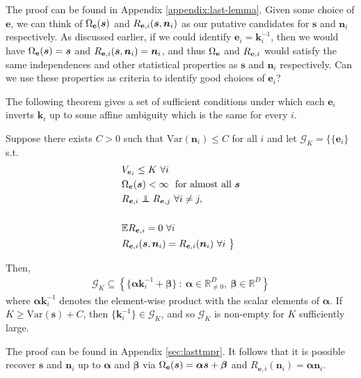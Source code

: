 The proof can be found in Appendix \ref{appendix:last-lemma}.
Given some choice of $\bm{e}$, we can think of $\Omega_{\mathbf{e}}(\bm{s})$ and $R_{\mathbf{e}, i}(\bm{s}, \bm{n}_i)$ as our putative candidates for $\bm{s}$ and $\bm{n}_i$ respectively.
As discussed earlier, if we could identify $\bm{e}_i=\bm{k}_i^{-1}$, then we would have $\Omega_{\mathbf{e}}(\bm{s}) = \bm{s}$ and $R_{\mathbf{e}, i}(\bm{s}, \bm{n}_i) = \bm{n}_i$, and thus $\Omega_{\mathbf{e}}$ and $R_{\mathbf{e}, i}$ would satisfy the same independences and other statistical properties as $\bm{s}$ and $\bm{n}_i$ respectively.
Can we use these properties as criteria to identify good choices of $\bm{e}_i$?

The following theorem gives a set of sufficient conditions under which each $\bm{e}_i$ inverts $\bm{k}_i$ up to some affine ambiguity which is the same for every $i$.

\begin{theorem}
\label{thm:lastthm}
Suppose there exists $C>0$ such that $\text{Var}(\bm{n}_i) \leq C$ for all $i$ and let $\mathcal{G}_K = \big\lbrace
\{\bm{e}_i \}$ s.t.
\begin{align}
    & V_{\bm{e}_i} \leq K \ \forall i \label{eq:resid_1}\\
    & \Omega_{\bm{e}}(\bm{s}) < \infty \  \text{ for almost all } \bm{s} \label{eq:resid_2}\\
    &R_{\bm{e}, i} \independent R_{\bm{e}, j} \ \forall i \not= j, \label{eq:resid_3}\\
    \\    &\mathbb{E} R_{\bm{e}, i} = 0 \ \forall i \label{eq:resid_5} \\
    &R_{\bm{e}, i}(\bm{s}, \bm{n}_i) = R_{\bm{e}, i}(\bm{n}_i) \ \forall i \ \big\rbrace \label{eq:resid_6}
\end{align}

Then,
\begin{align*}
    \mathcal{G}_K \subseteq\left\lbrace \{ \bm{\alpha} \bm{k}^{-1}_i + \bm{\beta} \} \ : \ \bm{\alpha} \in \mathbb{R}^{D}_{\not=0}, \: \bm{\beta} \in \mathbb{R}^{D} \right\rbrace
\end{align*}
where $\bm\alpha \bm{k}^{-1}_i$ denotes the element-wise product with the scalar elements of $\bm{\alpha}$.
If $K \geq \text{Var}(\bm{s}) + C$, then $ \{ \bm{k}^{-1}_i \}  \in \mathcal{G}_K$,
and so $\mathcal{G}_K$ is non-empty for $K$ sufficiently large.
\end{theorem}
The proof can be found in Appendix \ref{sec:lasttmpr}.
It follows that it is possible recover $\bm{s}$ and $\bm{n}_i$ up to $\bm{\alpha}$ and $\bm{\beta}$ via $\Omega_{\mathbf{e}}(\bm{s}) = \bm{\alpha}\bm{s} + \bm{\beta}$ and $R_{\bm{e}, i}(\bm{n}_i) = \bm{\alpha}\bm{n}_i$.

